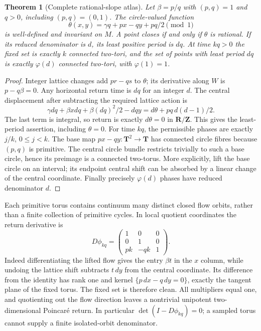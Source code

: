 \documentclass[10pt]{article}
\newtheorem{theorem}{Theorem}
\newcommand{\R}{\mathbf R}
\newcommand{\Z}{\mathbf Z}
\newcommand{\T}{\mathbf T}
\begin{document}
\begin{theorem}[Complete rational-slope atlas]
Let $\beta=p/q$ with $(p,q)=1$ and $q>0$, including $(p,q)=(0,1)$.
The circle-valued function
\[
 \theta(x,y)=\gamma q+px-qy+pq/2\pmod1
\]
is well-defined and invariant on $M$. A point closes if and only if $\theta$
is rational. If its reduced denominator is $d$, its least positive period
is $dq$. At time $kq>0$ the fixed set is exactly $k$ connected two-tori,
and the set of points with least period $dq$ is exactly $\varphi(d)$
connected two-tori, with $\varphi(1)=1$.
\end{theorem}
\begin{proof}
Integer lattice changes add $pr-qs$ to $\theta$; its derivative along
$W$ is $p-q\beta=0$. Any horizontal return time is $dq$ for an integer $d$.
The central displacement after subtracting the required lattice action is
\[
 \gamma dq+\beta x dq+\beta(dq)^2/2-dqy
 =d\theta+pq\,d(d-1)/2.
\]
The last term is integral, so return is exactly $d\theta=0$ in $\R/\Z$.
This gives the least-period assertion, including $\theta=0$.
For time $kq$, the permissible phases are exactly $j/k$, $0\le j<k$.
The base map $px-qy:\T^2\to\T$ has connected circle fibres because
$(p,q)$ is primitive. The central circle bundle restricts trivially to
such a base circle, hence its preimage is a connected two-torus. More
explicitly, lift the base circle on an interval; its endpoint central
shift can be absorbed by a linear change of the central coordinate.
Finally precisely $\varphi(d)$ phases have reduced denominator $d$.
\end{proof}

Each primitive torus contains continuum many distinct closed flow orbits,
rather than a finite collection of primitive cycles. In local quotient
coordinates the return derivative is
\[
 D\phi_{kq}=
 \begin{pmatrix}1&0&0\\0&1&0\\pk&-qk&1\end{pmatrix}.
\]
Indeed differentiating the lifted flow gives the entry $\beta t$ in the
$x$ column, while undoing the lattice shift subtracts $t\,dy$ from the
central coordinate. Its difference from the identity has rank one and
kernel $\{p\,dx-q\,dy=0\}$, exactly the tangent plane of the fixed torus.
The fixed set is therefore clean. All multipliers equal one, and quotienting
out the flow direction leaves a nontrivial unipotent two-dimensional
Poincar\'e return. In particular $\det(I-D\phi_{kq})=0$; a sampled torus
cannot supply a finite isolated-orbit denominator.
\end{document}
